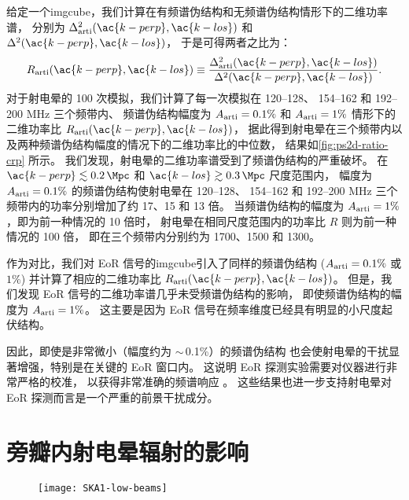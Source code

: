 给定一个\ac{imgcube}，我们计算在有频谱伪结构和无频谱伪结构情形下的二维功率谱，
分别为 $\Delta^2_{\R{arti}}(\ac{k-perp}, \ac{k-los})$
和 $\Delta^2(\ac{k-perp}, \ac{k-los})$，
于是可得两者之比为：
\begin{equation}
  R_{\R{arti}}(\ac{k-perp}, \ac{k-los})
    \equiv \frac{\Delta^2_{\R{arti}}(\ac{k-perp}, \ac{k-los})}{
      \Delta^2(\ac{k-perp}, \ac{k-los})} .
\end{equation}
对于射电晕的 100 次模拟，我们计算了每一次模拟在 \numrange{120}{128}、
\numrange{154}{162} 和 \numrange{192}{200} \si{\MHz} 三个频带内、
频谱伪结构幅度为 $A_{\mathrm{arti}} = 0.1\%$ 和 $A_{\mathrm{arti}} = 1\%$
情形下的二维功率比 $R_{\R{arti}}(\ac{k-perp}, \ac{k-los})$，
据此得到射电晕在三个频带内以及两种频谱伪结构幅度的情况下的二维功率比的中位数，
结果如\autoref{fig:ps2d-ratio-crp} 所示。
我们发现，射电晕的二维功率谱受到了频谱伪结构的严重破坏。
在 $\ac{k-perp} \lesssim \SI{0.2}{\per\Mpc}$ 和
$\ac{k-los} \gtrsim \SI{0.3}{\per\Mpc}$ 尺度范围内，
幅度为 $A_{\mathrm{arti}} = 0.1\%$ 的频谱伪结构使射电晕在 \numrange{120}{128}、
\numrange{154}{162} 和 \numrange{192}{200} \si{\MHz}
三个频带内的功率分别增加了约 17、15 和 13 倍。
当频谱伪结构的幅度为 $A_{\mathrm{arti}} = 1\%$，即为前一种情况的 10 倍时，
射电晕在相同尺度范围内的功率比 $R$ 则为前一种情况的 100 倍，
即在三个频带内分别约为 1700、1500 和 1300。

作为对比，我们对 EoR 信号的\ac{imgcube}引入了同样的频谱伪结构
($A_{\mathrm{arti}} = 0.1\%$ 或 $1\%$)
并计算了相应的二维功率比 $R_{\R{arti}}(\ac{k-perp}, \ac{k-los})$。
但是，我们发现 EoR 信号的二维功率谱几乎未受频谱伪结构的影响，
即使频谱伪结构的幅度为 $A_{\mathrm{arti}} = 1\%$。
这主要是因为 EoR 信号在频率维度已经具有明显的小尺度起伏结构。

因此，即使是非常微小（幅度约为 $\sim$\,0.1\%）的频谱伪结构
也会使射电晕的干扰显著增强，特别是在关键的 EoR 窗口内。
这说明 EoR 探测实验需要对仪器进行非常严格的校准，
以获得非常准确的频谱响应 \cite{barry2016}。
这些结果也进一步支持射电晕对 EoR 探测而言是一个严重的前景干扰成分。


\section{旁瓣内射电晕辐射的影响}
\label{sec:fscn}

\begin{figure}[htp]
  \centering
  \texttt{[image: SKA1-low-beams]}
  \label{fig:ska-beams}
\end{figure}

